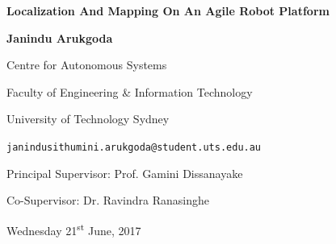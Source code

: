 \documentclass[12pt,a4paper]{report}
\begin{document}
\begin{titlepage}
	\centering
	
	
    {\huge\bfseries Localization And Mapping On An Agile Robot Platform\par}
	\vspace{2cm}
	
    {\Large\bfseries Janindu Arukgoda\par} 
    {\Large Centre for Autonomous Systems\par}
    {\Large Faculty of Engineering \& Information Technology\par}
    {\Large University of Technology Sydney\par}
    \vspace{1cm}
    
    {\large\texttt{janindusithumini.arukgoda{@}student.uts.edu.au}}
    \vspace{1cm}
    
    {\Large Principal Supervisor: Prof. Gamini Dissanayake\par}
    {\Large Co-Supervisor: Dr. Ravindra Ranasinghe\par}
	{\vfill}
    
	{\large Wednesday 21\textsuperscript{st} June, 2017 \par}
\end{titlepage}
\end{document}

